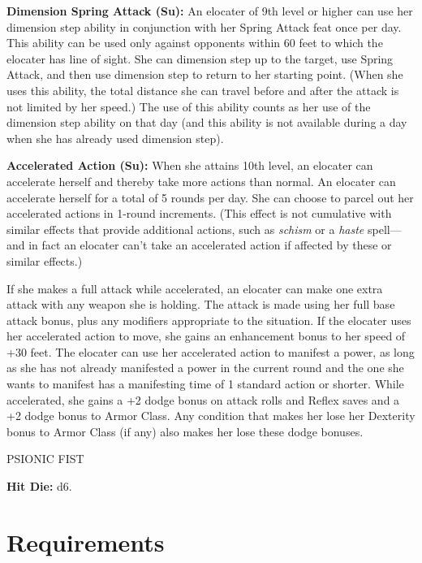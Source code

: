 \documentclass{article}
\begin{document}
\textbf{Dimension Spring Attack (Su):} An elocater of 9th level or higher can use 
her dimension step ability in conjunction with her Spring Attack feat once per 
day. This ability can be used only against opponents within 60 feet to which the 
elocater has line of sight. She can dimension step up to the target, use Spring 
Attack, and then use dimension step to return to her starting point. (When she 
uses this ability, the total distance she can travel before and after the attack 
is not limited by her speed.) The use of this ability counts as her use of the 
dimension step ability on that day (and this ability is not available during a 
day when she has already used dimension step).

\textbf{Accelerated Action (Su):} When she attains 10th level, an elocater can 
accelerate herself and thereby take more actions than normal. An elocater can accelerate 
herself for a total of 5 rounds per day. She can choose to parcel out her accelerated 
actions in 1-round increments. (This effect is not cumulative with similar effects 
that provide additional actions, such as \textit{schism }or a \textit{haste }spell---and 
in fact an elocater can't take an accelerated action if affected by these or similar 
effects.)

If she makes a full attack while accelerated, an elocater can make one extra attack 
with any weapon she is holding. The attack is made using her full base attack bonus, 
plus any modifiers appropriate to the situation. If the elocater uses her accelerated 
action to move, she gains an enhancement bonus to her speed of +30 feet. The elocater 
can use her accelerated action to manifest a power, as long as she has not already 
manifested a power in the current round and the one she wants to manifest has a 
manifesting time of 1 standard action or shorter. While accelerated, she gains 
a +2 dodge bonus on attack rolls and Reflex saves and a +2 dodge bonus to Armor 
Class. Any condition that makes her lose her Dexterity bonus to Armor Class (if 
any) also makes her lose these dodge bonuses. 

\vspace{12pt}
{\LARGE{}PSIONIC FIST}

\textbf{Hit Die:} d6.

\vspace{12pt}
\section*{\textbf{Requirements}}
\end{document}
